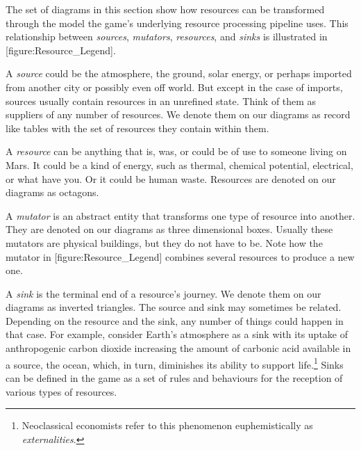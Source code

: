 
The set of diagrams in this section show how resources can be transformed through the model the game's underlying resource processing pipeline uses. This relationship between {\it sources}, {\it mutators}, {\it resources}, and {\it sinks} is illustrated in [figure:Resource_Legend].

    {}
    
A {\it source} could be the atmosphere, the ground, solar energy, or perhaps imported from another city or possibly even off world. But except in the case of imports, sources usually contain resources in an unrefined state. Think of them as suppliers of any number of resources. We denote them on our diagrams as record like tables with the set of resources they contain within them.

A {\it resource} can be anything that is, was, or could be of use to someone living on Mars. It could be a kind of energy, such as thermal, chemical potential, electrical, or what have you. Or it could be human waste. Resources are denoted on our diagrams as octagons.

A {\it mutator} is an abstract entity that transforms one type of resource into another. They are denoted on our diagrams as three dimensional boxes. Usually these mutators are physical buildings, but they do not have to be. Note how the mutator in [figure:Resource_Legend] combines several resources to produce a new one.

A {\it sink} is the terminal end of a resource's journey. We denote them on our diagrams as inverted triangles. The source and sink may sometimes be related. Depending on the resource and the sink, any number of things could happen in that case. For example, consider Earth's atmosphere as a sink with its uptake of anthropogenic carbon dioxide increasing the amount of carbonic acid available in a source, the ocean, which, in turn, diminishes its ability to support life.\footnote{Neoclassical economists refer to this phenomenon euphemistically as {\it externalities}.} Sinks can be defined in the game as a set of rules and behaviours for the reception of various types of resources.

